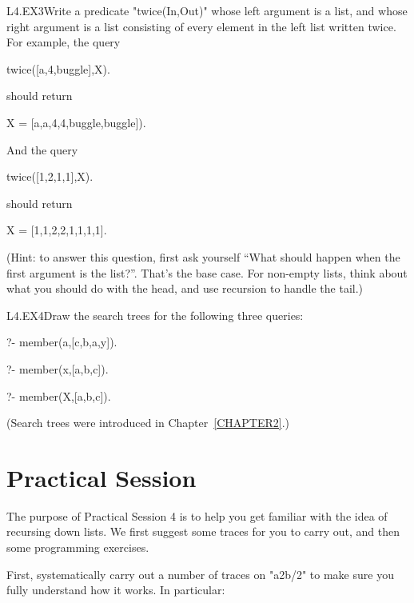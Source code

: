 \begin{LPNexercise}{L4.EX3}Write a predicate "twice(In,Out)"
whose left argument is a list,
and whose right argument is a list consisting of every element in the
left list written twice.  For example, the query
\begin{LPNcodedisplay}
twice([a,4,buggle],X).
\end{LPNcodedisplay}
should return
\begin{LPNcodedisplay}
X = [a,a,4,4,buggle,buggle]).
\end{LPNcodedisplay}
And the query
\begin{LPNcodedisplay}
twice([1,2,1,1],X).
\end{LPNcodedisplay}
should return
\begin{LPNcodedisplay}
X = [1,1,2,2,1,1,1,1].
\end{LPNcodedisplay}

(Hint: to answer this question, first ask yourself ``What should happen
when the first argument is the  list?''.  That's the base case.
For non-empty lists, think about what you should do with the head, and
use recursion to handle the tail.)
\end{LPNexercise}


\begin{LPNexercise}{L4.EX4}Draw the search trees for the following three queries:

\begin{LPNcodedisplay}
?- member(a,[c,b,a,y]).

?- member(x,[a,b,c]).

?- member(X,[a,b,c]).

\end{LPNcodedisplay}
(Search trees were introduced in Chapter~\ref{CHAPTER2}.)
\end{LPNexercise}


\section{Practical Session}\label{SEC.L4.PRAXIS}



The purpose of Practical Session 4 is to help you get familiar with
the idea of recursing down lists.  We first suggest some traces for
you to carry out, and then some programming exercises.

First, systematically carry out a number of traces on
"a2b/2" to make sure you fully understand how it
works. In particular:

